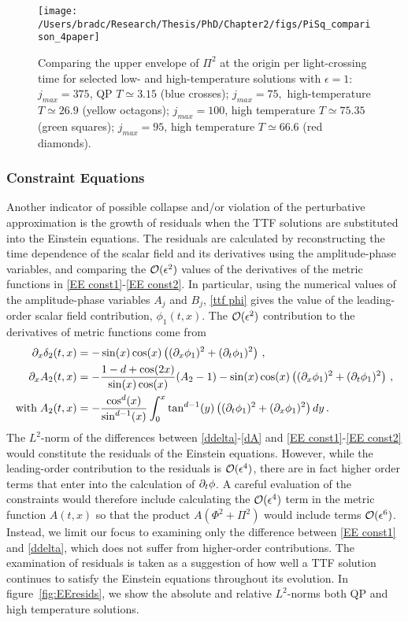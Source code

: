 \documentclass[../PhD.tex]{subfiles}
\begin{document}
\begin{figure}[h]
	\centering
	\texttt{[image: /Users/bradc/Research/Thesis/PhD/Chapter2/figs/PiSq\_comparison\_4paper]}
	\caption{Comparing the upper envelope of $\Pi^2$ at the origin per light-crossing time for selected low- and high-temperature solutions with $\epsilon = 1$: $j_{max} = 375$, QP $T \simeq 3.15$ (blue crosses); $j_{max} = 75,$ high-temperature $T \simeq 26.9$ (yellow octagons); $j_{max} = 100$, high temperature $T \simeq 75.35$ (green squares); $j_{max} = 95$, high temperature $T \simeq 66.6$ (red diamonds).}
	\label{fig: compare Pi sq}
\end{figure}


\subsubsection{Constraint Equations}

Another indicator of possible collapse and/or violation of the perturbative approximation is the growth of residuals when the TTF solutions are substituted into the Einstein equations. The residuals are calculated by reconstructing the time dependence of the scalar field and its derivatives using the amplitude-phase variables, and comparing the $\mathcal O(\epsilon^2)$ values of the derivatives of the metric functions in \eqref{EE const1}-\eqref{EE const2}. In particular, using the numerical values of the amplitude-phase variables $A_j$ and $B_j$, \eqref{ttf phi} gives the value of the leading-order scalar field contribution, $\phi_1(t,x)$. The $\mathcal O(\epsilon^2)$ contribution to the derivatives of metric functions come from
\begin{align}
\label{ddelta}
\partial_x \delta_2(t,x) &= -\sin(x) \cos(x) \left( (\partial_x \phi_1)^2 + (\partial_t \phi_1)^2 \right) \, , \\
\label{dA}
\partial_x A_2(t,x) &= -\frac{1 - d + \cos(2x)}{\sin(x) \cos(x)}(A_2 - 1) - \sin(x) \cos(x) \left( (\partial_x \phi_1)^2 + (\partial_t \phi_1)^2 \right) \, , \\
\text{with} \; A_2(t,x) &= - \frac{\cos^d(x)}{\sin^{d-1}(x)} \int^x_0 \tan^{d-1}(y) \left( (\partial_t \phi_1)^2 + (\partial_x \phi_1)^2 \right) dy \, .
\end{align}
The $L^2$-norm of the differences between \eqref{ddelta}-\eqref{dA} and \eqref{EE const1}-\eqref{EE const2} would constitute the residuals of the Einstein equations. However, while the leading-order contribution to the residuals is $\mathcal O(\epsilon^4)$, there are in fact higher order terms that enter into the calculation of $\partial_t \phi$. A careful evaluation of the constraints would therefore include calculating the $\mathcal O(\epsilon^4)$ term in the metric function $A(t,x)$ so that the product $A ( \Phi^2 + \Pi^2)$ would include terms $\mathcal O(\epsilon^6)$. Instead, we limit our focus to examining only the difference between \eqref{EE const1} and \eqref{ddelta}, which does not suffer from higher-order contributions. The examination of residuals is taken as a suggestion of how well a TTF solution continues to satisfy the Einstein equations throughout its evolution. In figure~\ref{fig:EEresids}, we show the absolute and relative $L^2$-norms both QP and high temperature solutions.
\end{document}
